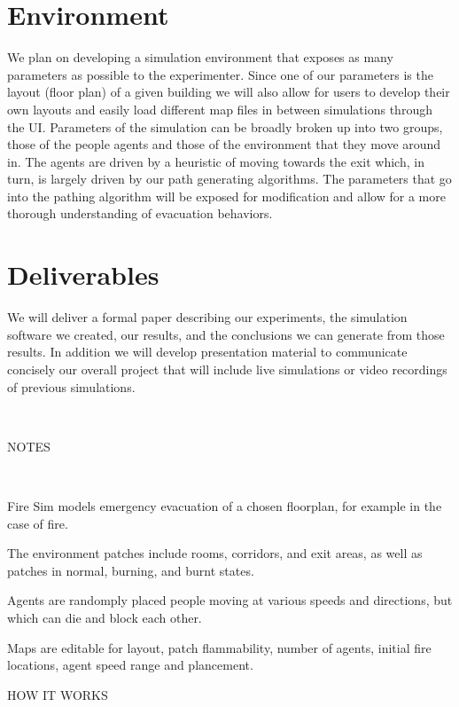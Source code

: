 \documentclass[12pt,letterpaper]{article}
\begin{document}
\section {Environment}

We plan on developing a simulation environment that exposes as many parameters as possible to the experimenter. Since one of our parameters is the layout (floor plan) of a given building we will also allow for users to develop their own layouts and easily load different map files in between simulations through the UI. Parameters of the simulation can be broadly broken up into two groups, those of the people agents and those of the environment that they move around in. The agents are driven by a heuristic of moving towards the exit which, in turn, is largely driven by our path generating algorithms\cite{caparriniGeneralSolverNetLogo2018}.  The parameters that go into the pathing algorithm will be exposed for modification and allow for a more thorough understanding of evacuation behaviors. 



\section {Deliverables}
We will deliver a formal paper describing our experiments, the simulation software we created, our results, and the conclusions we can generate from those results. In addition we will develop presentation material to communicate concisely our overall project that will include live simulations or video recordings of previous simulations.

\

NOTES

\


Fire Sim models emergency evacuation of a chosen floorplan, for example in the case of fire.

The environment patches include rooms, corridors, and exit areas, as well as patches in normal, burning, and burnt states.

Agents are randomply placed people moving at various speeds and directions, but which can die and block each other.

Maps are editable for layout, patch flammability, number of agents, initial fire locations, agent speed range and plancement.







HOW IT WORKS
\end{document}

